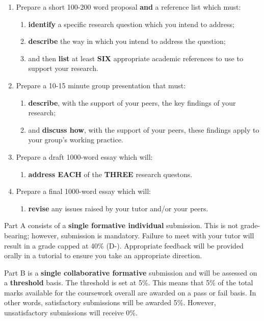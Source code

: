 \documentclass{../fal_assignment}
\begin{document}
\begin{enumerate}[label=(\alph*)]
    \item Prepare a short 100-200 word proposal \textbf{and} a reference list which must:
    	\begin{enumerate}[label=\roman*.]
    		\item \textbf{identify} a specific research question which you intend to address;
    		\item \textbf{describe} the way in which you intend to address the question;
    		\item and then \textbf{list} at least \textbf{SIX} appropriate academic references to use to support your research.
	\end{enumerate}
    \item Prepare a 10-15 minute group presentation that must:
    	\begin{enumerate}[label=\roman*.]
    		\item \textbf{describe}, with the support of your peers, the key findings of your research;
    		\item and \textbf{discuss how}, with the support of your peers, these findings apply to your group's working practice.
	\end{enumerate}
    \item Prepare a draft 1000-word essay which will:
    	\begin{enumerate}[label=\roman*.]
    		\item \textbf{address EACH} of the \textbf{THREE} research questons.
	\end{enumerate}
    \item Prepare a final 1000-word essay which will:
    	\begin{enumerate}[label=\roman*.]
    		\item \textbf{revise} any issues raised by your tutor and/or your peers.
	\end{enumerate}
\end{enumerate}

Part A consists of a \textbf{single formative individual} submission. This is not grade-bearing; however, submission is mandatory. Failure to meet with your tutor will result in a grade capped at 40\% (D-). Appropriate feedback will be provided orally in a tutorial to ensure you take an appropriate direction.

Part B is a \textbf{single collaborative formative} submission and will be assessed on a \textbf{threshold} basis. The threshold is set at 5\%. This means that 5\% of the total marks available for the coursework overall are awarded on a pass or fail basis. In other words, satisfactory submissions will be awarded 5\%. However, unsatisfactory submissions will receive 0\%.
\end{document}
